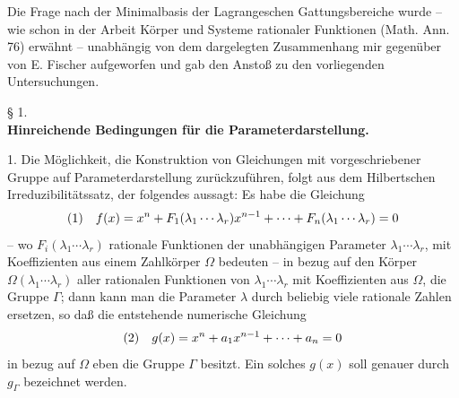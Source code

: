 Die Frage nach der Minimalbasis der Lagrangeschen Gattungsbereiche wurde -- wie schon in der Arbeit \glqq{}Körper und Systeme rationaler Funktionen\grqq{} (Math. Ann. 76) erwähnt -- unabhängig von dem dargelegten Zusammenhang mir gegenüber von E. Fischer aufgeworfen und gab den Anstoß zu den vorliegenden Untersuchungen.

\begin{center}
§ 1.\\[0.75em]
\textbf{Hinreichende Bedingungen für die Parameterdarstellung.}
\end{center}

1. Die Möglichkeit, die Konstruktion von Gleichungen mit vorgeschriebener Gruppe auf Parameterdarstellung zurückzuführen, folgt aus dem Hilbertschen Irreduzibilitätssatz, der folgendes aussagt: Es habe die Gleichung
\[
\begin{array}{@{}l@{\quad}l@{}}
(1)& \displaystyle f(x)=x^n+F_1(\lambda_1\cdots\lambda_r)x^{n-1}+\cdots+F_n(\lambda_1\cdots\lambda_r)=0
\end{array}
\]
-- wo $F_i(\lambda_1\cdots\lambda_r)$ rationale Funktionen der unabhängigen Parameter $\lambda_1\cdots\lambda_r$, mit Koeffizienten aus einem Zahlkörper $\Omega$ bedeuten -- in bezug auf den Körper $\Omega(\lambda_1\cdots\lambda_r)$ aller rationalen Funktionen von $\lambda_1\cdots\lambda_r$ mit Koeffizienten aus $\Omega$, die Gruppe $\Gamma$; dann kann man die Parameter $\lambda$ durch beliebig viele rationale Zahlen ersetzen, so daß die entstehende numerische Gleichung
\[
\begin{array}{@{}l@{\quad}l@{}}
(2)& \displaystyle g(x)=x^n+a_1x^{n-1}+\cdots+a_n=0
\end{array}
\]
in bezug auf $\Omega$ eben die Gruppe $\Gamma$ besitzt. Ein solches $g(x)$ soll genauer durch $g_\Gamma$ bezeichnet werden.

